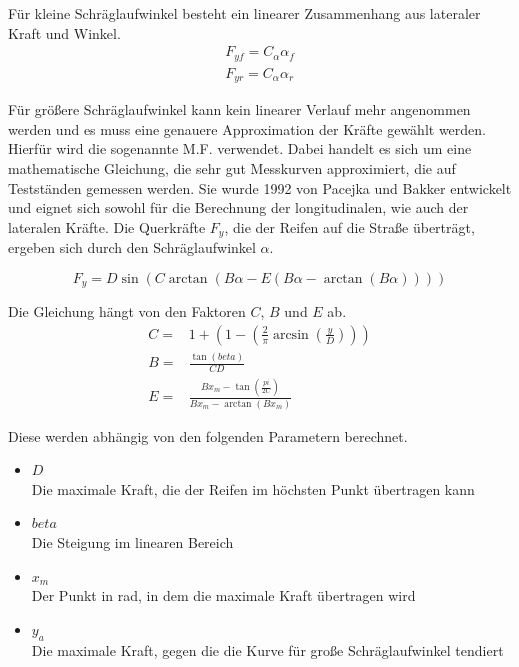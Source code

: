 \documentclass{like}
\begin{document}
Für kleine Schräglaufwinkel besteht ein linearer Zusammenhang aus lateraler Kraft und Winkel.
\begin{eqnarray}
F_{yf} = C_\alpha \alpha_f \\
F_{yr} = C_\alpha \alpha_r
\end{eqnarray}

Für größere Schräglaufwinkel kann kein linearer Verlauf mehr angenommen werden und es muss eine genauere Approximation der Kräfte gewählt werden. Hierfür wird die sogenannte \ac{M.F.}  \cite{magicFormula} verwendet. Dabei handelt es sich um eine mathematische Gleichung, die sehr gut Messkurven approximiert, die auf Testständen gemessen werden.
Sie wurde 1992 von Pacejka und Bakker entwickelt und eignet sich sowohl für die Berechnung der longitudinalen, wie auch der lateralen Kräfte. 
Die Querkräfte $F_y$, die der Reifen auf die Straße überträgt, ergeben sich durch den Schräglaufwinkel $\alpha$.

\begin{equation}
F_y =  D\sin(C\arctan(B\alpha - E(B\alpha - \arctan(B\alpha))))  \label{eq:magicF} 
\end{equation}

Die Gleichung hängt von den Faktoren \(C\), \(B\) und \(E\) ab. 
\begin{eqnarray}
C =& 1 + \left(1- \left(\frac{2}{\pi} \arcsin \left(\frac{y}{D} \right) \right) \right) \\
B =& \frac{\tan(beta)}{CD} \\
E =& \frac{ B  x_m - \tan \left(\frac{pi}{2 C} \right)}{Bx_m - \arctan(Bx_m)}
\end{eqnarray}


Diese werden abhängig von den folgenden Parametern berechnet.

\begin{itemize}
	\item $D$ \\	
	Die maximale Kraft, die der Reifen im höchsten Punkt übertragen kann
	\item $beta$\\
	Die Steigung im linearen Bereich 
	\item $x_m$ \\
	Der Punkt in rad, in dem die maximale Kraft übertragen wird
	\item $y_a$ \\
	Die maximale Kraft, gegen die die Kurve für große Schräglaufwinkel tendiert 
\end{itemize}
\end{document}

